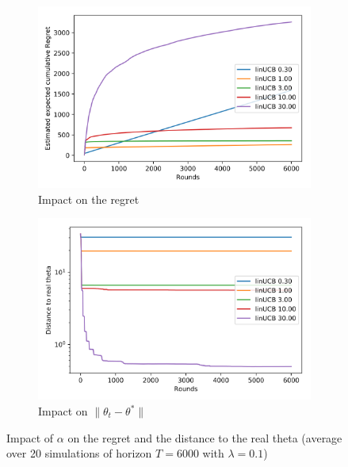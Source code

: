 \documentclass[a4paper, 11pt]{article}
\newcommand{\norm}[1]{\|#1\|}
\begin{document}
\begin{figure}[ht]
  \centering
  \begin{subfigure}[t]{0.48\textwidth}
    \centering
    \includegraphics[width=\textwidth]{ex2_linUCB_alpha_regret}
    \caption{Impact on the regret}\label{fig:ex2-linUCB-alpha-regret}
  \end{subfigure}
  \quad
  \begin{subfigure}[t]{0.48\textwidth}
    \centering
    \includegraphics[width=\textwidth]{ex2_linUCB_alpha_dist}
    \caption{Impact on $\norm{\theta_t - \theta^*}$}\label{fig:ex2-linUCB-alpha-dist}
  \end{subfigure}
  \caption{Impact of $\alpha$ on the regret and the distance to the
    real theta (average over 20 simulations of horizon $T=6000$ with
    $\lambda=0.1$)}\label{fig:ex2-linUCB-alpha}
\end{figure}


\newpage

\end{document}
